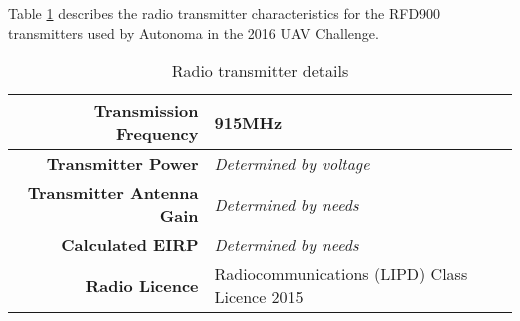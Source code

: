 Table \ref{tab:radio} describes the radio transmitter characteristics for the RFD900 transmitters used by Autonoma in the 2016 UAV Challenge.

\begin{table}[H]
	\centering
	\begin{tabular}{|r|l|}
		\hline
		\textbf{Transmission Frequency}   & 915MHz \\ \hline
		\textbf{Transmitter Power}        & \textit{Determined by voltage} \\ \hline
		\textbf{Transmitter Antenna Gain} & \textit{Determined by needs} \\ \hline
		\textbf{Calculated EIRP}          & \textit{Determined by needs} \\ \hline
		\textbf{Radio Licence}			  & Radiocommunications (LIPD) Class Licence 2015 \\ \hline
	\end{tabular}
	\caption{Radio transmitter details}
	\label{tab:radio}
\end{table}